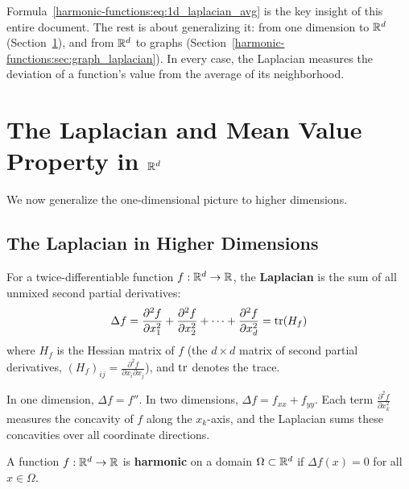 \begin{notechapter}
\begin{intuitionbox}
Formula~\eqref{harmonic-functions:eq:1d_laplacian_avg} is the key insight of this entire
document. The rest is about generalizing it: from one dimension to
$\R^d$ (Section~\ref{harmonic-functions:sec:continuous}), and from $\R^d$ to graphs
(Section~\ref{harmonic-functions:sec:graph_laplacian}). In every case, the Laplacian
measures the deviation of a function's value from the average of its
neighborhood.
\end{intuitionbox}


\section{The Laplacian and Mean Value Property in \texorpdfstring{$\R^d$}{Rd}}
\label{harmonic-functions:sec:continuous}

We now generalize the one-dimensional picture to higher dimensions.

\subsection{The Laplacian in Higher Dimensions}

\begin{definition}[Laplacian in $\R^d$]
\label{harmonic-functions:def:cont_laplacian}
For a twice-differentiable function $f: \mathbb{R}^d \to \mathbb{R}$, the \textbf{Laplacian}
is the sum of all unmixed second partial derivatives:
\begin{equation}
\Delta f = \frac{\partial^2 f}{\partial x_1^2}
         + \frac{\partial^2 f}{\partial x_2^2}
         + \cdots
         + \frac{\partial^2 f}{\partial x_d^2}
         = \operatorname{tr}(H_f)
\end{equation}
where $H_f$ is the Hessian matrix of $f$ (the $d \times d$ matrix of second
partial derivatives, $(H_f)_{ij} = \frac{\partial^2 f}{\partial x_i
\partial x_j}$), and $\operatorname{tr}$ denotes the trace.
\end{definition}

In one dimension, $\Delta f = f''$. In two dimensions,
$\Delta f = f_{xx} + f_{yy}$. Each term $\frac{\partial^2 f}{\partial x_k^2}$
measures the concavity of $f$ along the $x_k$-axis, and the Laplacian sums
these concavities over all coordinate directions.

\begin{definition}
\label{harmonic-functions:def:harmonic_cont}
A function $f: \mathbb{R}^d \to \mathbb{R}$ is \textbf{harmonic} on a domain
$\Omega \subset \mathbb{R}^d$ if $\Delta f(x) = 0$ for all $x \in \Omega$.
\end{definition}


\end{notechapter}
